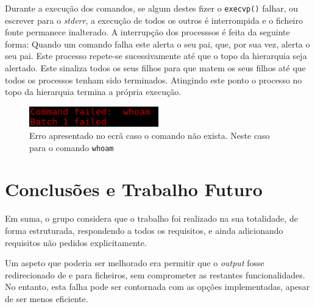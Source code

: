 \documentclass[12pt,a4paper]{report}
\begin{document}
    Durante a execução dos comandos, se algum destes fizer o
    \texttt{execvp()} falhar, ou escrever para o \textit{stderr}, a
    execução de todos os outros é interrompida e o ficheiro fonte permanece
    inalterado. A interrupção dos processsos é feita da seguinte forma: Quando
    um comando falha este alerta o seu pai, que, por sua vez, alerta o seu pai.
    Este processo repete-se sucessivamente até que o topo da hierarquia seja
    alertado. Este sinaliza todos os seus filhos para que matem os seus
    filhos até que todos os processos tenham sido terminados. Atingindo
    este ponto o processo no topo da hierarquia termina a própria execução.

    \begin{figure}[h]
        \centering
        \includegraphics[width=0.5\textwidth]{./images/execError.png}
        \caption{Erro apresentado no ecrã caso o comando não exista. Neste caso
                    para o comando \texttt{whoam}}
    \end{figure}

\chapter{Conclusões e Trabalho Futuro}
    Em suma, o grupo considera que o trabalho foi realizado na sua
    totalidade, de forma estruturada, respondendo a todos os requisitos, e ainda
    adicionando requisitos não pedidos explicitamente.

    Um aspeto que poderia ser melhorado era permitir que o \textit{output} fosse
    redirecionado de e para ficheiros, sem comprometer as restantes
    funcionalidades. No entanto, esta falha pode ser contornada com as opções
    implementadas, apesar de ser menos eficiente.
\end{document}
